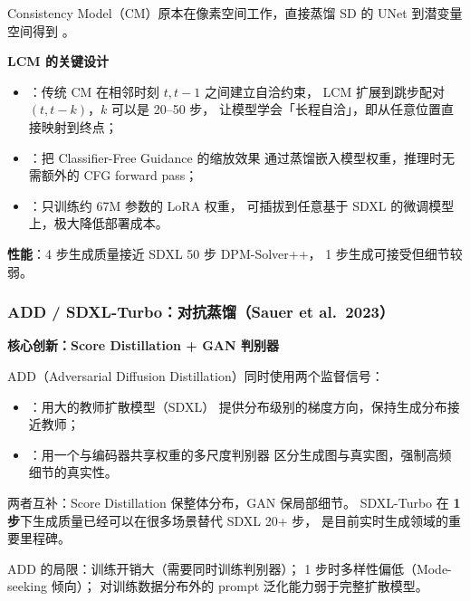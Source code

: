 Consistency Model（CM）原本在像素空间工作，直接蒸馏 SD 的 UNet 到潜变量空间得到 。

\begin{conceptbox}
\textbf{LCM 的关键设计}

\begin{itemize}
  \item {}：传统 CM 在相邻时刻 $t, t-1$ 之间建立自洽约束，
        LCM 扩展到跳步配对 $(t, t-k)$，$k$ 可以是 20--50 步，
        让模型学会「长程自洽」，即从任意位置直接映射到终点；
  \item {}：把 Classifier-Free Guidance 的缩放效果
        通过蒸馏嵌入模型权重，推理时无需额外的 CFG forward pass；
  \item {}：只训练约 67M 参数的 LoRA 权重，
        可插拔到任意基于 SDXL 的微调模型上，极大降低部署成本。
\end{itemize}

\textbf{性能}：4 步生成质量接近 SDXL 50 步 DPM-Solver++，
1 步生成可接受但细节较弱。
\end{conceptbox}

\subsubsection{ADD / SDXL-Turbo：对抗蒸馏（Sauer et al.\ 2023）}

\begin{conceptbox}
\textbf{核心创新：Score Distillation + GAN 判别器}

ADD（Adversarial Diffusion Distillation）同时使用两个监督信号：
\begin{itemize}
  \item {}：用大的教师扩散模型（SDXL）
        提供分布级别的梯度方向，保持生成分布接近教师；
  \item {}：用一个与编码器共享权重的多尺度判别器
        区分生成图与真实图，强制高频细节的真实性。
\end{itemize}

两者互补：Score Distillation 保整体分布，GAN 保局部细节。
SDXL-Turbo 在 \textbf{1 步}下生成质量已经可以在很多场景替代 SDXL 20+ 步，
是目前实时生成领域的重要里程碑。
\end{conceptbox}

\begin{warnbox}
ADD 的局限：训练开销大（需要同时训练判别器）；
1 步时多样性偏低（Mode-seeking 倾向）；
对训练数据分布外的 prompt 泛化能力弱于完整扩散模型。
\end{warnbox}

